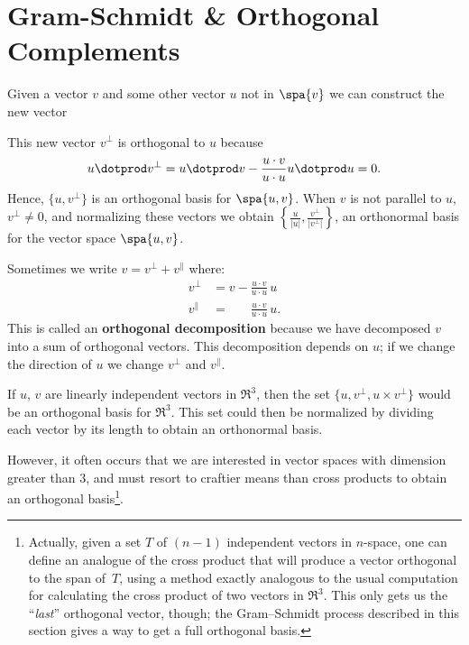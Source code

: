 %



\section{Gram-Schmidt \& Orthogonal Complements}\label{gramschmidt}


Given a vector $v$ and some other vector $u$ not in  $\spa\{v\} $ we can construct the new vector 
\begin{center}
\hypertarget{projectionpic}{}
\end{center}
This new vector $v^\perp$ is orthogonal to $u$ because 
\[
u\dotprod v^\perp = u\dotprod v - \frac{u\cdot v}{u\cdot u}u\dotprod u = 0.
\]
Hence, $\{u, v^\perp\}$ is an orthogonal basis for $\spa \{u,v\}$.  When $v$ is not parallel to $u$, $v^\perp \neq 0$, and normalizing these vectors we obtain $\left\{\frac{u}{|u|}, \frac{v^\perp}{|v^\perp|} \right\}$, an orthonormal basis for the vector space $\spa\{u,v\}$.

Sometimes we write $v = v^\perp + v^\parallel$ where:
\begin{align*}
v^\perp &= v-\frac{u\cdot v}{u\cdot u}\, u \\[1mm]
v^\parallel &= \phantom{v-}\frac{u\cdot v}{u\cdot u}\, u.
\end{align*}
This is called an {\bfseries orthogonal decomposition} because we have decomposed $v$ into a sum of orthogonal vectors.  This decomposition depends on $u$; if we change the direction of $u$ we change $v^\perp$ and $v^\parallel$.

If $u$, $v$ are linearly independent vectors in $\Re^3$, then the set $\{u, v^\perp, u\times v^\perp \}$ would be an orthogonal basis for $\Re^3$.  This set could then be normalized by dividing each vector by its length to obtain an orthonormal basis.

However, it often occurs that we are interested in vector spaces with dimension greater than $3$, and must resort to craftier means than cross products to obtain an orthogonal basis\footnote{Actually, given a set $T$ of $(n-1)$ independent vectors in $n$-space, one can define an analogue of the cross product that will produce a vector orthogonal to the span of~$T$, using a method exactly analogous to the usual computation for calculating the cross product of two vectors in $\Re^3$.  This only gets us the ``\emph{last}'' orthogonal vector, though; the Gram--Schmidt process described in this section gives a way to get a full orthogonal basis.}.

